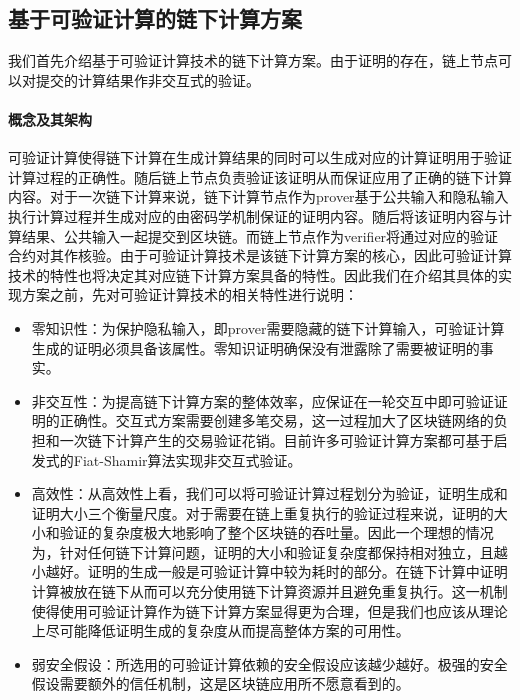 \subsection{基于可验证计算的链下计算方案}
我们首先介绍基于可验证计算技术的链下计算方案。由于证明的存在，链上节点可以对提交的计算结果作非交互式的验证。

\paragraph{概念及其架构}
可验证计算使得链下计算在生成计算结果的同时可以生成对应的计算证明用于验证计算过程的正确性。随后链上节点负责验证该证明从而保证应用了正确的链下计算内容。对于一次链下计算来说，链下计算节点作为prover基于公共输入和隐私输入执行计算过程并生成对应的由密码学机制保证的证明内容。随后将该证明内容与计算结果、公共输入一起提交到区块链。而链上节点作为verifier将通过对应的验证合约对其作核验。由于可验证计算技术是该链下计算方案的核心，因此可验证计算技术的特性也将决定其对应链下计算方案具备的特性。因此我们在介绍其具体的实现方案之前，先对可验证计算技术的相关特性进行说明：
\begin{itemize}
    \setlength{\itemsep}{0pt}
    \setlength{\parsep}{0pt}
    \setlength{\parskip}{0pt}
    \item 零知识性：为保护隐私输入，即prover需要隐藏的链下计算输入，可验证计算生成的证明必须具备该属性。零知识证明确保没有泄露除了需要被证明的事实。
    \item 非交互性：为提高链下计算方案的整体效率，应保证在一轮交互中即可验证证明的正确性。交互式方案需要创建多笔交易，这一过程加大了区块链网络的负担和一次链下计算产生的交易验证花销。目前许多可验证计算方案都可基于启发式的Fiat-Shamir算法\cite{10.1007/3-540-47721-7_12}实现非交互式验证。
    \item 高效性：从高效性上看，我们可以将可验证计算过程划分为验证，证明生成和证明大小三个衡量尺度。对于需要在链上重复执行的验证过程来说，证明的大小和验证的复杂度极大地影响了整个区块链的吞吐量。因此一个理想的情况为，针对任何链下计算问题，证明的大小和验证复杂度都保持相对独立，且越小越好。证明的生成一般是可验证计算中较为耗时的部分。在链下计算中证明计算被放在链下从而可以充分使用链下计算资源并且避免重复执行。这一机制使得使用可验证计算作为链下计算方案显得更为合理，但是我们也应该从理论上尽可能降低证明生成的复杂度从而提高整体方案的可用性。
    \item 弱安全假设：所选用的可验证计算依赖的安全假设应该越少越好。极强的安全假设需要额外的信任机制，这是区块链应用所不愿意看到的。
\end{itemize}

